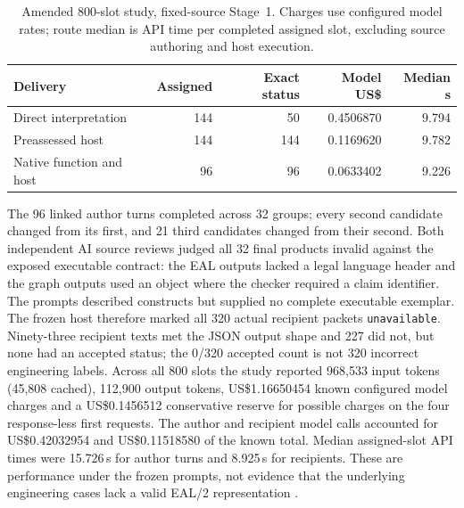\documentclass[preprint,12pt]{elsarticle}
\begin{document}
\begin{table}[!htbp]
\centering\small
\caption{Amended 800-slot study, fixed-source Stage~1. Charges use configured model rates; route median is API time per completed assigned slot, excluding source authoring and host execution.}
\label{tab:deployment-routes}
\begin{tabular}{@{}lrrrr@{}}
\toprule
Delivery & Assigned & Exact status & Model US\$ & Median s\\
\midrule
Direct interpretation & 144 & 50 & 0.4506870 & 9.794\\
Preassessed host & 144 & 144 & 0.1169620 & 9.782\\
Native function and host & 96 & 96 & 0.0633402 & 9.226\\
\bottomrule
\end{tabular}
\end{table}

The 96 linked author turns completed across 32 groups; every second candidate changed from its first, and 21 third candidates changed from their second. Both independent AI source reviews judged all 32 final products invalid against the exposed executable contract: the EAL outputs lacked a legal language header and the graph outputs used an object where the checker required a claim identifier. The prompts described constructs but supplied no complete executable exemplar. The frozen host therefore marked all 320 actual recipient packets \texttt{unavailable}. Ninety-three recipient texts met the JSON output shape and 227 did not, but none had an accepted status; the 0/320 accepted count is not 320 incorrect engineering labels. Across all 800 slots the study reported 968,533 input tokens (45,808 cached), 112,900 output tokens, US\$1.16650454 known configured model charges and a US\$0.1456512 conservative reserve for possible charges on the four response-less first requests. The author and recipient model calls accounted for US\$0.42032954 and US\$0.11518580 of the known total. Median assigned-slot API times were 15.726\,s for author turns and 8.925\,s for recipients. These are performance under the frozen prompts, not evidence that the underlying engineering cases lack a valid EAL/2 representation \citep{earlDeployment800}.
\end{document}
